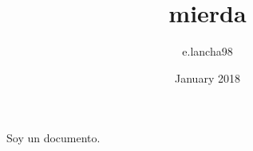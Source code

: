 \documentclass{article}
\title{mierda}
\author{e.lancha98 }
\date{January 2018}
\begin{document}
\maketitle

Soy un documento.
\alkdshgaljshbals
\end{document}

